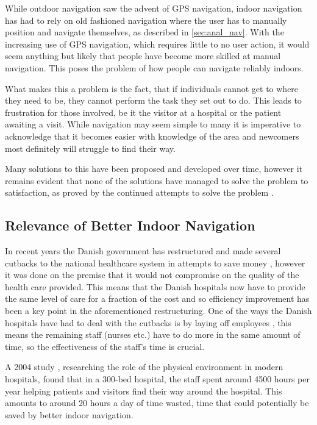 While outdoor navigation saw the advent of GPS navigation, indoor navigation has had to rely on old fashioned navigation where the user has to manually position and navigate themselves, as described in \cref{sec:anal_nav}. With the increasing use of GPS navigation, which requires little to no user action, it would seem anything but likely that people have become more skilled at manual navigation. This poses the problem of how people can navigate reliably indoors.

What makes this a problem is the fact, that if individuals cannot get to where they need to be, they cannot perform the task they set out to do. This leads to frustration for those involved, be it the visitor at a hospital or the patient awaiting a visit. While navigation may seem simple to many it is imperative to acknowledge that it becomes easier with knowledge of the area and newcomers most definitely will struggle to find their way.

Many solutions to this have been proposed and developed over time, however it remains evident that none of the solutions have managed to solve the problem to satisfaction, as proved by the continued attempts to solve the problem \cite{skejby_attempt}.

\subsection{Relevance of Better Indoor Navigation}
In recent years the Danish government has restructured and made several cutbacks to the national healthcare system in attempts to save money \cite{cutback_danNHS}, however it was done on the premise that it would not compromise on the quality of the health care provided. This means that the Danish hospitals now have to provide the same level of care for a fraction of the cost and so efficiency improvement has been a key point in the aforementioned restructuring. One of the ways the Danish hospitals have had to deal with the cutbacks is by laying off employees \cite{cutback_firing}, this means the remaining staff (nurses etc.) have to do more in the same amount of time, so the effectiveness of the staff's time is crucial.

A 2004 study \cite{twaste_2004}, researching the role of the physical environment in modern hospitals, found that in a 300-bed hospital, the staff spent around 4500 hours per year helping patients and visitors find their way around the hospital. This amounts to around 20 hours a day of time wasted, time that could potentially be saved by better indoor navigation.


